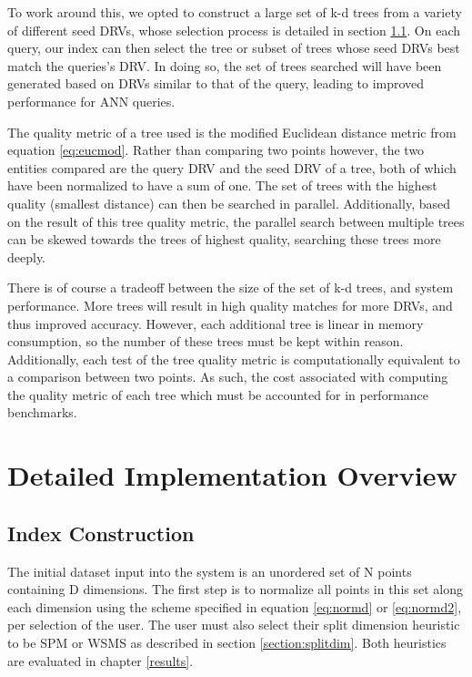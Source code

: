 To work around this, we opted to construct a large set of k-d trees from a variety of different seed DRVs, whose selection process is detailed in section \ref{sec:myalgconst}.  On each query, our index can then select the tree or subset of trees whose seed DRVs best match the queries's DRV.  In doing so, the set of trees searched will have been generated based on DRVs similar to that of the query, leading to improved performance for ANN queries.

The quality metric of a tree used is the modified Euclidean distance metric from equation \ref{eq:eucmod}.  Rather than comparing two points however, the two entities compared are the query DRV and the seed DRV of a tree, both of which have been normalized to have a sum of one.  The set of trees with the highest quality (smallest distance) can then be searched in parallel.  Additionally, based on the result of this tree quality metric, the parallel search between multiple trees can be skewed towards the trees of highest quality, searching these trees more deeply.

There is of course a tradeoff between the size of the set of k-d trees, and system performance.  More trees will result in high quality matches for more DRVs, and thus improved accuracy.  However, each additional tree is linear in memory consumption, so the number of these trees must be kept within reason.  Additionally, each test of the tree quality metric is computationally equivalent to a comparison between two points.  As such, the cost associated with computing the quality metric of each tree which must be accounted for in performance benchmarks.

\section{Detailed Implementation Overview}
\label{sec:myimpl}

\subsection{Index Construction}
\label{sec:myalgconst}

The initial dataset input into the system is an unordered set of N points containing D dimensions.  The first step is to normalize all points in this set along each dimension using the scheme specified in equation \ref{eq:normd} or \ref{eq:normd2}, per selection of the user.  The user must also select their split dimension heuristic to be SPM or WSMS as described in section \ref{section:splitdim}.  Both heuristics are evaluated in chapter \ref{results}.

